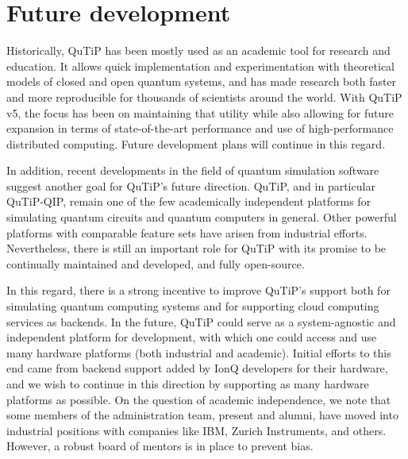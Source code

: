 \documentclass[preprint,3p,sort&compress]{elsarticle}
\begin{document}




\section{Future development}
Historically, QuTiP has been mostly used as an academic tool for research and education. It allows quick implementation and experimentation with theoretical models of closed and open quantum systems, and has made research both faster and more reproducible for thousands of scientists around the world. With QuTiP v5, the focus has been on maintaining that utility while also allowing for future expansion in terms of state-of-the-art performance and use of high-performance distributed computing.  Future development plans will continue in this regard.

In addition, recent developments in the field of quantum simulation software suggest another goal for QuTiP's future direction.
QuTiP, and in particular QuTiP-QIP, remain one of the few academically independent platforms for simulating quantum circuits and quantum computers in general.  Other powerful platforms with comparable feature sets have arisen from industrial efforts. Nevertheless, there is still an important role for QuTiP with its promise to be continually maintained and developed, and fully open-source.

In this regard, there is a strong incentive to improve QuTiP's support both for simulating quantum computing systems and for supporting cloud computing services as backends. In the future, QuTiP could serve as a system-agnostic and independent platform for development, with which one could access and use many hardware platforms (both industrial and academic). Initial efforts to this end came from backend support added by IonQ developers for their hardware, and we wish to continue in this direction by supporting as many hardware platforms as possible. On the question of academic independence, we note that some members of the administration team, present and alumni, have moved into industrial positions with companies like IBM, Zurich Instruments, and others. However, a robust board of mentors is in place to prevent bias.
\end{document}
